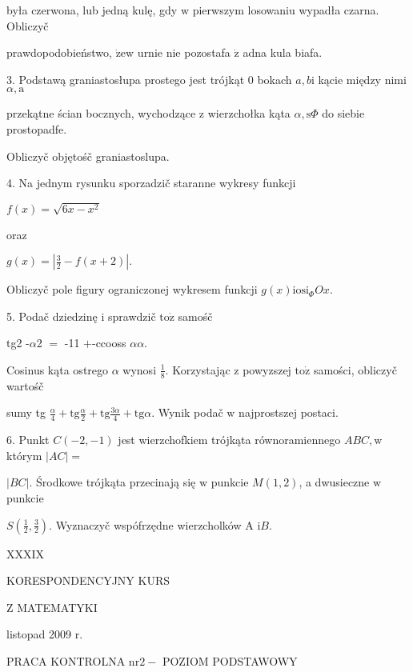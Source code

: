 \documentclass[a4paper,12pt]{article}
\begin{document}
była czerwona, lub jedną kulę, gdy $\mathrm{w}$ pierwszym losowaniu wypadła czarna. Obliczyč

prawdopodobieństwo, $\dot{\mathrm{z}}\mathrm{e}\mathrm{w}$ urnie nie pozostafa $\dot{\mathrm{z}}$ adna kula biafa.

3. Podstawą graniastosłupa prostego jest trójkąt $0$ bokach $a, b\mathrm{i}$ kącie między nimi $\alpha, \mathrm{a}$

przekątne ścian bocznych, wychodzące $\mathrm{z}$ wierzchołka kąta $\alpha, \mathrm{s}\Phi$ do siebie prostopadfe.

Obliczyč objętośč graniastoslupa.

4. Na jednym rysunku sporzadzič staranne wykresy funkcji

$f(x)=\sqrt{6x-x^{2}}$

oraz

$g(x)=|\displaystyle \frac{3}{2}-f(x+2)|.$

Obliczyč pole figury ograniczonej wykresem funkcji $g(x)\mathrm{i}\mathrm{o}\mathrm{s}\mathrm{i}_{\Phi}Ox.$

5. Podač dziedzinę $\mathrm{i}$ sprawdzič $\mathrm{t}\mathrm{o}\dot{\mathrm{z}}$ samośč

tg2 -$\alpha$2 $=$ -11 $+$-ccooss $\alpha\alpha$.

Cosinus kąta ostrego $\alpha$ wynosi $\displaystyle \frac{1}{8}$. Korzystając $\mathrm{z}$ powyzszej $\mathrm{t}\mathrm{o}\dot{\mathrm{z}}$ samości, obliczyč wartośč

sumy tg $\displaystyle \frac{\alpha}{4}+\mathrm{t}\mathrm{g}\frac{\alpha}{2}+\mathrm{t}\mathrm{g}\frac{3\alpha}{4}+\mathrm{t}\mathrm{g}\alpha$. Wynik podač $\mathrm{w}$ najprostszej postaci.

6. Punkt $C(-2,-1)$ jest wierzchofkiem trójkąta równoramiennego $ABC, \mathrm{w}$ którym $|AC|=$

$|BC|$. Środkowe trójkąta przecinają się $\mathrm{w}$ punkcie $M(1,2)$, a dwusieczne $\mathrm{w}$ punkcie

$S(\displaystyle \frac{1}{2},\frac{3}{2})$. Wyznaczyč wspófrzędne wierzcholków A $\mathrm{i}B.$





XXXIX

KORESPONDENCYJNY KURS

Z MATEMATYKI

listopad 2009 r.

PRACA KONTROLNA $\mathrm{n}\mathrm{r} 2-$ POZIOM PODSTAWOWY
\end{document}
